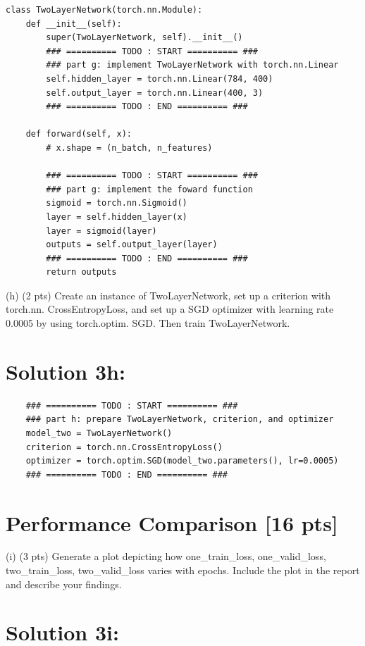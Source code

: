 \documentclass[10pt]{article}
\begin{document}
\begin{verbatim}
class TwoLayerNetwork(torch.nn.Module):
    def __init__(self):
        super(TwoLayerNetwork, self).__init__()
        ### ========== TODO : START ========== ###
        ### part g: implement TwoLayerNetwork with torch.nn.Linear
        self.hidden_layer = torch.nn.Linear(784, 400)
        self.output_layer = torch.nn.Linear(400, 3)
        ### ========== TODO : END ========== ###

    def forward(self, x):
        # x.shape = (n_batch, n_features)

        ### ========== TODO : START ========== ###
        ### part g: implement the foward function
        sigmoid = torch.nn.Sigmoid()
        layer = self.hidden_layer(x)
        layer = sigmoid(layer)
        outputs = self.output_layer(layer)
        ### ========== TODO : END ========== ###
        return outputs
\end{verbatim}

(h) (2 pts) Create an instance of TwoLayerNetwork, set up a criterion with torch.nn. CrossEntropyLoss, and set up a SGD optimizer with learning rate 0.0005 by using torch.optim. SGD. Then train TwoLayerNetwork.

\section*{Solution 3h:}

\begin{verbatim}
    ### ========== TODO : START ========== ###
    ### part h: prepare TwoLayerNetwork, criterion, and optimizer
    model_two = TwoLayerNetwork()
    criterion = torch.nn.CrossEntropyLoss()
    optimizer = torch.optim.SGD(model_two.parameters(), lr=0.0005)
    ### ========== TODO : END ========== ###
\end{verbatim}

\section*{Performance Comparison [16 pts]}
(i) (3 pts) Generate a plot depicting how one\_train\_loss, one\_valid\_loss, two\_train\_loss, two\_valid\_loss varies with epochs. Include the plot in the report and describe your findings.

\section*{Solution 3i:}
\end{document}
